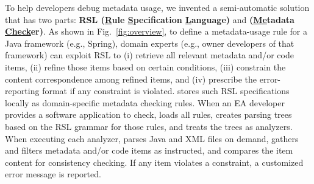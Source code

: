To help developers debug metadata usage, we invented a semi-automatic solution that has two parts: \textbf{RSL (\underline{R}ule \underline{S}pecification \underline{L}anguage)} and \textbf{\tool (\underline{Me}tadata \underline{Check}er)}. As shown in Fig.~\ref{fig:overview}, to define a metadata-usage rule for a Java framework (e.g., Spring), domain experts (e.g., owner developers of that framework) can exploit RSL to (i) retrieve all relevant metadata and/or code items, (ii) refine those items based on certain conditions, (iii) constrain the content correspondence among refined items, and (iv) prescribe the error-reporting format if any constraint is violated. 
\tool stores such RSL specifications locally as domain-specific metadata checking rules. 
When an EA developer provides a software application to check, \tool loads all rules, 
creates parsing trees based on the RSL grammar for those rules, and treats the trees as analyzers. %
When executing each analyzer, \tool parses Java and XML files on demand, gathers and filters metadata and/or code items as instructed, and compares the item content for consistency checking. If any item violates a constraint, a customized error message is reported.

